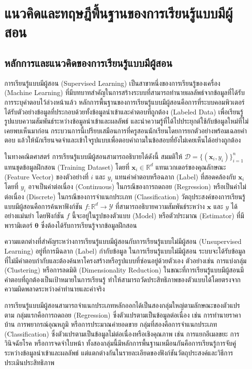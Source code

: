 \chapter{แนวคิดและทฤษฎีพื้นฐานของการเรียนรู้แบบมีผู้สอน}

\section{หลักการและแนวคิดของการเรียนรู้แบบมีผู้สอน}
การเรียนรู้แบบมีผู้สอน (Supervised Learning) เป็นสาขาหนึ่งของการเรียนรู้ของเครื่อง (Machine Learning) ที่มีบทบาทสำคัญในการสร้างระบบที่สามารถทำนายผลลัพธ์จากข้อมูลที่ได้รับการระบุคำตอบไว้ล่วงหน้าแล้ว หลักการพื้นฐานของการเรียนรู้แบบมีผู้สอนคือการที่ระบบคอมพิวเตอร์ได้รับตัวอย่างข้อมูลที่ประกอบด้วยทั้งข้อมูลนำเข้าและคำตอบที่ถูกต้อง (Labeled Data) เพื่อเรียนรู้รูปแบบความสัมพันธ์ระหว่างข้อมูลนำเข้าและผลลัพธ์ และนำความรู้ที่ได้ไปประยุกต์ใช้กับข้อมูลใหม่ที่ไม่เคยพบเห็นมาก่อน กระบวนการนี้เปรียบเสมือนการที่ครูสอนนักเรียนโดยการยกตัวอย่างพร้อมเฉลยคำตอบ แล้วให้นักเรียนจดจำและเข้าใจรูปแบบเพื่อตอบคำถามในข้อสอบที่ยังไม่เคยเห็นได้อย่างถูกต้อง

ในทางคณิตศาสตร์ การเรียนรู้แบบมีผู้สอนสามารถอธิบายได้ดังนี้ สมมติให้ $\mathcal{D} = \{(\mathbf{x}_i, y_i)\}_{i=1}^{n}$ แทนชุดข้อมูลฝึกสอน (Training Dataset) โดยที่ $\mathbf{x}_i \in \mathbb{R}^{d}$ แทนเวกเตอร์ของคุณลักษณะ (Feature Vector) ของตัวอย่างที่ $i$ และ $y_i$ แทนค่าคำตอบหรือฉลาก (Label) ที่สอดคล้องกับ $\mathbf{x}_i$ โดยที่ $y_i$ อาจเป็นค่าต่อเนื่อง (Continuous) ในกรณีของการถดถอย (Regression) หรือเป็นค่าไม่ต่อเนื่อง (Discrete) ในกรณีของการจำแนกประเภท (Classification) วัตถุประสงค์ของการเรียนรู้แบบมีผู้สอนคือการค้นหาฟังก์ชัน $f: \mathbb{R}^{d} \rightarrow \mathcal{Y}$ ที่สามารถอธิบายความสัมพันธ์ระหว่าง $\mathbf{x}$ และ $y$ ได้อย่างแม่นยำ โดยฟังก์ชัน $f$ นี้จะอยู่ในรูปของตัวแบบ (Model) หรือตัวประมาณ (Estimator) ที่มีพารามิเตอร์ $\boldsymbol{\theta}$ ซึ่งต้องได้รับการเรียนรู้จากข้อมูลฝึกสอน

ความแตกต่างที่สำคัญระหว่างการเรียนรู้แบบมีผู้สอนกับการเรียนรู้แบบไม่มีผู้สอน (Unsupervised Learning) อยู่ที่การมีฉลาก (Label) กำกับข้อมูล ในการเรียนรู้แบบไม่มีผู้สอน ระบบจะได้รับข้อมูลที่ไม่มีคำตอบกำกับและต้องค้นหาโครงสร้างหรือรูปแบบที่ซ่อนอยู่ด้วยตัวเอง ตัวอย่างเช่น การแบ่งกลุ่ม (Clustering) หรือการลดมิติ (Dimensionality Reduction) ในขณะที่การเรียนรู้แบบมีผู้สอนมีคำตอบที่ถูกต้องเป็นเป้าหมายในการเรียนรู้ ทำให้สามารถวัดประสิทธิภาพของตัวแบบได้โดยตรงจากความผิดพลาดระหว่างค่าทำนายและค่าจริง

การเรียนรู้แบบมีผู้สอนสามารถจำแนกประเภทหลักออกได้เป็นสองกลุ่มใหญ่ตามลักษณะของตัวแปรตาม กลุ่มแรกคือการถดถอย (Regression) ซึ่งตัวแปรตามเป็นข้อมูลต่อเนื่อง เช่น การทำนายราคาบ้าน การพยากรณ์อุณหภูมิ หรือการประมาณค่ายอดขาย กลุ่มที่สองคือการจำแนกประเภท (Classification) ซึ่งตัวแปรตามเป็นข้อมูลไม่ต่อเนื่องหรือเชิงคุณภาพ เช่น การแยกอีเมลขยะ การวินิจฉัยโรค หรือการจดจำใบหน้า ทั้งสองกลุ่มนี้มีหลักการพื้นฐานเหมือนกันคือการเรียนรู้การจับคู่ระหว่างข้อมูลนำเข้าและผลลัพธ์ แต่แตกต่างกันในรายละเอียดของฟังก์ชันวัตถุประสงค์และวิธีการประเมินประสิทธิภาพ

